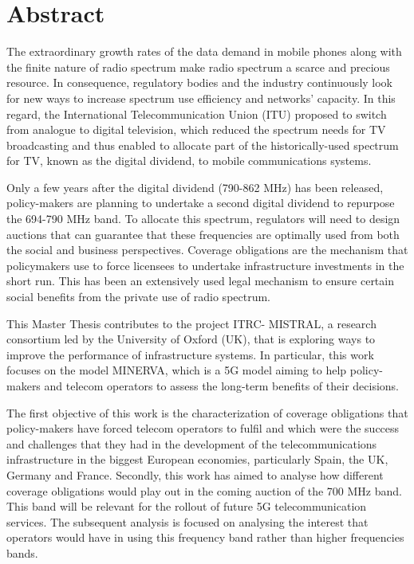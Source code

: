 \chapter{Abstract}

The extraordinary growth rates of the data demand in mobile phones along with the finite nature of radio spectrum make radio spectrum a scarce and precious resource. In consequence, regulatory bodies and the industry continuously look for new ways to increase spectrum use efficiency and networks’ capacity. In this regard, the International Telecommunication Union (ITU) proposed to switch from analogue to digital television, which reduced the spectrum needs for TV broadcasting and thus enabled to allocate part of the historically-used spectrum for TV, known as the digital dividend, to mobile communications systems.\par

Only a few years after the digital dividend (790-862 MHz) has been released, policy-makers are planning to undertake a second digital dividend to repurpose the 694-790 MHz band. To allocate this spectrum, regulators will need to design auctions that can guarantee that these frequencies are optimally used from both the social and business perspectives. Coverage obligations are the mechanism that policymakers use to force licensees to undertake infrastructure investments in the short run. This has been an extensively used legal mechanism to ensure certain social benefits from the private use of radio spectrum.\par

This Master Thesis contributes to the project ITRC- MISTRAL, a research consortium led by the University of Oxford (UK), that is exploring ways to improve the performance of infrastructure systems. In particular, this work focuses on the model MINERVA, which is a 5G model aiming to help policy-makers and telecom operators to assess the long-term benefits of their decisions.\par

The first objective of this work is the characterization of coverage obligations that policy-makers have forced telecom operators to fulfil and which were the success and challenges that they had in the development of the telecommunications infrastructure in the biggest European economies, particularly Spain, the UK, Germany and France. Secondly, this work has aimed to analyse how different coverage obligations would play out in the coming auction of the 700 MHz band. This band will be relevant for the rollout of future 5G telecommunication services. The subsequent analysis is focused on analysing the interest that operators would have in using this frequency band rather than higher frequencies bands. \par


